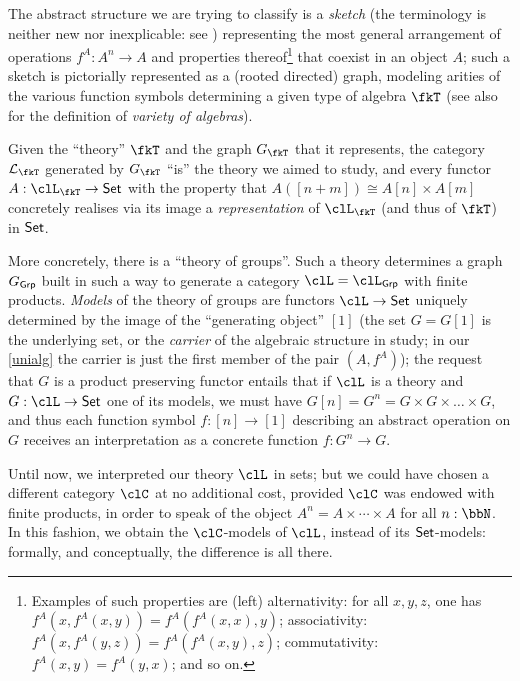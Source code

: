 The abstract structure we are trying to classify is a \emph{sketch} (the terminology is neither new nor inexplicable: see \cite{ehresmann1968esquisses,coppey1984leccons, Bor2}) representing the most general arrangement of operations $f^A: A^n \to A$ and properties thereof\footnote{Examples of such properties are (left) alternativity: for all $x,y,z$, one has $f^A(x,f^A(x,y)) = f^A(f^A(x,x),y)$; associativity: $f^A(x,f^A(y,z)) = f^A(f^A(x,y),z)$; commutativity: $f^A(x,y)=f^A(y,x)$; and so on.} that coexist in an object $A$; such a sketch is pictorially represented as a (rooted directed) graph, modeling arities of the various function symbols determining a given type of algebra $\fkT$ (see also \cite[XV.3]{grillet2007abstract} for the definition of \emph{variety of algebras}).%

Given the ``theory'' $\fkT$ and the graph $G_{\fkT}$ that it represents, the category $\mathcal{L}_{\fkT}$ generated by $G_\fkT$ ``is'' the theory we aimed to study, and every functor $A: \clL_{\fkT} \to \Set$ with the property that $A([n+m]) \cong A[n] \times A[m]$ concretely realises via its image a \emph{representation} of $\clL_\fkT$ (and thus of $\fkT$) in $\mathsf{Set}$.
\begin{remark}\label{rmk_explicit_theoer}
	More concretely, there is a ``theory of groups''. Such a theory determines a graph $G_{\mathsf{Grp}}$ built in such a way to generate a category $\clL=\clL_{\cate{Grp}}$ with finite products. \emph{Models} of the theory of groups are functors $\clL \to \Set$ uniquely determined by the image of the ``generating object'' $[1]$ (the set $G=G[1]$ is the underlying set, or the \emph{carrier} of the algebraic structure in study; in our \autoref{unialg} the carrier is just the first member of the pair $(A,f^A)$); the request that $G$ is a product preserving functor entails that if $\clL$ is a theory and $G: \clL \to \Set$ one of its models, we must have $G[n]=G^n = G \times G \times\dots\times G$, and thus each function symbol $f: [n]\to [1]$ describing an abstract operation on $G$ receives an interpretation as a concrete function $f: G^n \to G$.
\end{remark}
Until now, we interpreted our theory $\clL$ in sets; but we could have chosen a different category $\clC$ at no additional cost, provided $\clC$ was endowed with finite products, in order to speak of the object $A^n = A\times \cdots\times A$ for all $n: \bbN$. In this fashion, we obtain the $\clC$-models of $\clL$, instead of its $\mathsf{Set}$-models: formally, and conceptually, the difference is all there.

